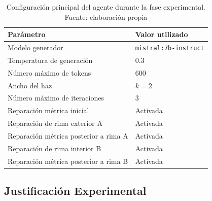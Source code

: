 \documentclass[12pt,a4paper,twoside,openright]{book}
\begin{document}
\begin{table}[h]
    \centering
    \begin{tabular}{|l|l|}
        \hline
        \textbf{Parámetro} & \textbf{Valor utilizado} \\
        \hline
        Modelo generador & \texttt{mistral:7b-instruct} \\
        \hline
        Temperatura de generación & 0.3 \\
        \hline
        Número máximo de tokens & 600 \\
        \hline
        Ancho del haz & $k = 2$ \\
        \hline
        Número máximo de iteraciones & 3 \\
        \hline
        Reparación métrica inicial & Activada \\
        \hline
        Reparación de rima exterior A & Activada \\
        \hline
        Reparación métrica posterior a rima A & Activada \\
        \hline
        Reparación de rima interior B & Activada \\
        \hline
        Reparación métrica posterior a rima B & Activada \\
        \hline
    \end{tabular}
    \caption{Configuración principal del agente durante la fase experimental. Fuente: elaboración propia}
    \label{tab:configuracionAgente}
\end{table}


\subsection{Justificación Experimental}


\end{document}
